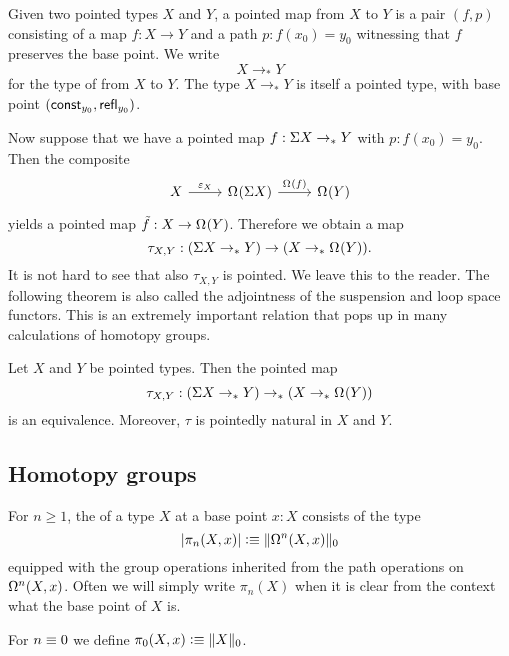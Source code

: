 \begin{defn}
  Given two pointed types $X$ and $Y$, a pointed map from $X$ to $Y$ is a pair $(f,p)$ consisting of a map $f:X\to Y$ and a path $p:f(x_0)=y_0$ witnessing that $f$ preserves the base point. We write
  \begin{equation*}
    X\to_\ast Y
  \end{equation*}
  for the type of  from $X$ to $Y$. The type $X\to_\ast Y$ is itself a pointed type, with base point $(\mathsf{const}_{y_0},\refl{y_0})$. 
\end{defn}

Now suppose that we have a pointed map $f:\susp X\to_\ast Y$ with $p:f(x_0)=y_0$. Then the composite
\begin{equation*}
  \begin{tikzcd}
    X \arrow[r,"\varepsilon_X"] & \loopspace{\susp{X}} \arrow[r,"\loopspace{f}"] & \loopspace{Y}
  \end{tikzcd}
\end{equation*}
yields a pointed map $\tilde{f}:X\to\loopspace{Y}$. Therefore we obtain a map
\begin{equation*}
  \tau_{X,Y} :(\susp X \to_\ast Y) \to (X \to_\ast \loopspace{Y}).
\end{equation*}
It is not hard to see that also $\tau_{X,Y}$ is pointed. We leave this to the reader. The following theorem is also called the adjointness of the suspension and loop space functors. This is an extremely important relation that pops up in many calculations of homotopy groups.

\begin{thm}
  Let $X$ and $Y$ be pointed types. Then the pointed map
  \begin{equation*}
    \tau_{X,Y} : (\susp X \to_\ast Y) \to_\ast (X\to_\ast \loopspace Y)
  \end{equation*}
  is an equivalence. Moreover, $\tau$ is pointedly natural in $X$ and $Y$. 
\end{thm}

\subsection{Homotopy groups}

\begin{defn}
For $n\geq 1$, the  of a type $X$ at a base point $x:X$ consists of the type
\begin{equation*}
|\pi_n(X,x)| \defeq \trunc{0}{\loopspace[n]{X,x}}
\end{equation*}
equipped with the group operations inherited from the path operations on $\loopspace[n]{X,x}$. 
Often we will simply write $\pi_n(X)$ when it is clear from the context what the base point of $X$ is.

For $n\jdeq 0$ we define $\pi_0(X,x)\defeq \trunc{0}{X}$. 
\end{defn}

